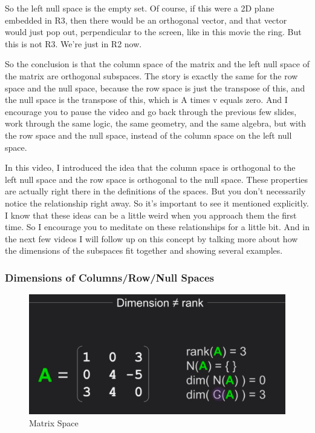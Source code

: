 \documentclass[fleqn,10pt]{olplainarticle}
\theoremstyle{definition}
\theoremstyle{remark}
\begin{document}
So the left null space is the empty set. Of course, if this were a 2D plane embedded in R3, then there would be an orthogonal vector, and that vector would just pop out, perpendicular to the screen, like in this movie the ring. But this is not R3. We're just in R2 now.

So the conclusion is that the column space of the matrix and the left null space of the matrix are orthogonal subspaces. The story is exactly the same for the row space and the null space, because the row space is just the transpose of this, and the null space is the transpose of this, which is A times v equals zero. And I encourage you to pause the video and go back through the previous few slides, work through the same logic, the same geometry, and the same algebra, but with the row space and the null space, instead of the column space on the left null space.

In this video, I introduced the idea that the column space is orthogonal to the left null space and the row space is orthogonal to the null space. These properties are actually right there in the definitions of the spaces. But you don't necessarily notice the relationship right away. So it's important to see it mentioned explicitly. I know that these ideas can be a little weird when you approach them the first time. So I encourage you to meditate on these relationships for a little bit. And in the next few videos I will follow up on this concept by talking more about how the dimensions of the subspaces fit together and showing several examples.

\pagebreak

\subsubsection*{Dimensions of Columns/Row/Null Spaces}

\begin{figure}[ht]
	\centering
	\includegraphics[width=0.6\linewidth]{images/matrix-space-31.png}
	\caption{Matrix Space}
	\label{fig:matrix_space_31}
\end{figure}
\end{document}
